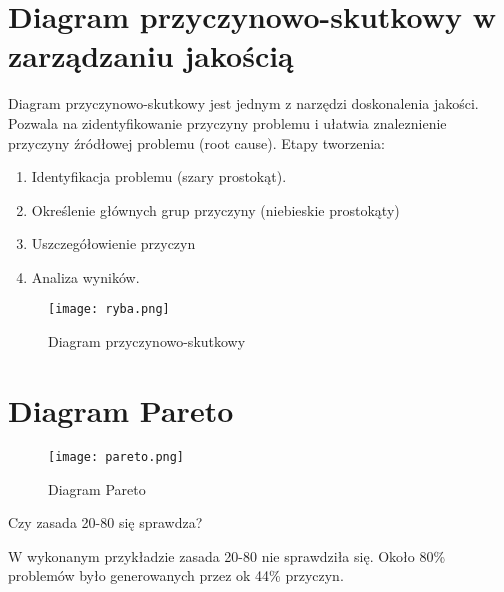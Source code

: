 
\section{Diagram przyczynowo-skutkowy w zarządzaniu jakością}

Diagram przyczynowo-skutkowy jest jednym z narzędzi doskonalenia jakości. Pozwala na zidentyfikowanie przyczyny problemu i ułatwia znaleznienie przyczyny źródłowej problemu (root cause). Etapy tworzenia:
\begin{enumerate}
\item	Identyfikacja problemu (szary prostokąt).
\item	Określenie głównych grup przyczyny (niebieskie prostokąty)
\item	Uszczegółowienie przyczyn 
\item	Analiza wyników.
\end{enumerate}

\begin{figure}[h]
\begin{center}
\texttt{[image: ryba.png]}
\caption[Diagram przyczynowo-skutkowy]{Diagram przyczynowo-skutkowy}
\label{rysunekProces}
\end{center}
\end{figure}




\section{Diagram Pareto}

\begin{figure}[h]
\begin{center}
\texttt{[image: pareto.png]}
\caption[Diagram Pareto]{Diagram Pareto}
\label{rysunekProces}
\end{center}
\end{figure}


Czy zasada 20-80 się sprawdza?

W wykonanym przykładzie zasada 20-80 nie sprawdziła się.  Około 80\% problemów było generowanych przez ok 44\% przyczyn.



